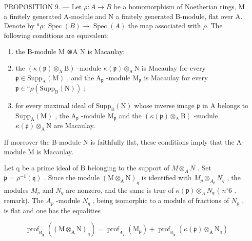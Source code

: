PROPOSITION 9. — Let \(\rho: A \to B\) be a homomorphism of Noetherian rings, M a finitely generated A-module and N a finitely generated B-module, flat over A. Denote by \({}^{a}\rho: \operatorname{Spec}(B) \longrightarrow \operatorname{Spec}(A)\) the map associated with \(\rho\). The following conditions are equivalent:

\begin{enumerate}
\def\labelenumi{(\roman{enumi})}
\item
  the B-module M ⊗A N is Macaulay;
\item
  the \((\kappa(\mathfrak{p})\otimes_{\mathrm{A}}\mathrm{B})\) -module \(\kappa(\mathfrak{p})\otimes_{\mathrm{A}}\mathrm{N}\) is Macaulay for every \(\mathfrak{p}\in\mathrm{Supp}_{\mathrm{A}}(\mathrm{M})\) , and the \(\mathrm{A}_{\mathfrak{p}}\) -module \(\mathrm{M}_{\mathfrak{p}}\) is Macaulay for every \(\mathfrak{p}\in{}^{a}\rho(\mathrm{Supp}_{\mathrm{B}}(\mathrm{N}))\) ;
\item
  for every maximal ideal of \(\mathrm{Supp}_{\mathrm{B}}(\mathrm{N})\) whose inverse image \(\mathfrak{p}\) in A belongs to \(\mathrm{Supp}_{\mathrm{A}}(\mathrm{M})\) , the \(\mathrm{A}_{\mathfrak{p}}\) -module \(\mathrm{M}_{\mathfrak{p}}\) and the \((\kappa(\mathfrak{p}) \otimes_{\mathrm{A}} \mathrm{B})\) -module \(\kappa(\mathfrak{p}) \otimes_{\mathrm{A}} \mathrm{N}\) are Macaulay.
\end{enumerate}

If moreover the B-module N is faithfully flat, these conditions imply that the A-module M is Macaulay.

Let q be a prime ideal of B belonging to the support of \(M \otimes_{A} N\) . Set \(\mathfrak{p} = \rho^{-1}(\mathfrak{q})\) . Since the module \((\mathrm{M} \otimes_{\mathrm{A}} \mathrm{N})_{\mathfrak{q}}\) is identified with \(M_{p} \otimes_{A_{p}} N_{q}\) , the modules \(M_{p}\) and \(N_{q}\) are nonzero, and the same is true of \(\kappa(\mathfrak{p}) \otimes_{A} N_{\mathfrak{q}}\) ( \(n^{\circ} 6\) , remark). The \(A_{p}\) -module \(N_{q}\) , being isomorphic to a module of fractions of \(N_{p}\) , is flat and one has the equalities

\[
\operatorname{prof} _ {\mathrm{B} _ {\mathfrak {q}}} \left(\left(\mathrm{M} \otimes_ {\mathrm{A}} \mathrm{N}\right) _ {\mathfrak {q}}\right) = \operatorname{prof} _ {A_ {\mathfrak {p}}} \left(\mathrm{M} _ {\mathfrak {p}}\right) + \operatorname{prof} _ {\mathrm{B} _ {\mathfrak {q}}} (\kappa (\mathfrak {p}) \otimes_ {\mathrm{A}} \mathrm{N} _ {\mathfrak {q}})
\]

